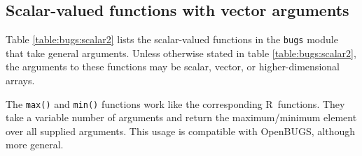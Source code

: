\documentclass[11pt, a4paper, titlepage]{report}
\newcommand{\OpenBUGS}{\textsf{OpenBUGS}}
\newcommand{\R}{\textsf{R}}
\begin{document}

\subsection{Scalar-valued functions with vector arguments}

Table \ref{table:bugs:scalar2} lists the scalar-valued functions in the
\texttt{bugs} module that take general arguments. Unless otherwise
stated in table \ref{table:bugs:scalar2}, the arguments to these functions
may be scalar, vector, or higher-dimensional arrays.

The \verb+max()+ and \verb+min()+ functions work like the
corresponding \R\ functions. They take a variable number of arguments
and return the maximum/minimum element over all supplied
arguments. This usage is  compatible with \OpenBUGS, although more general.
\end{document}
